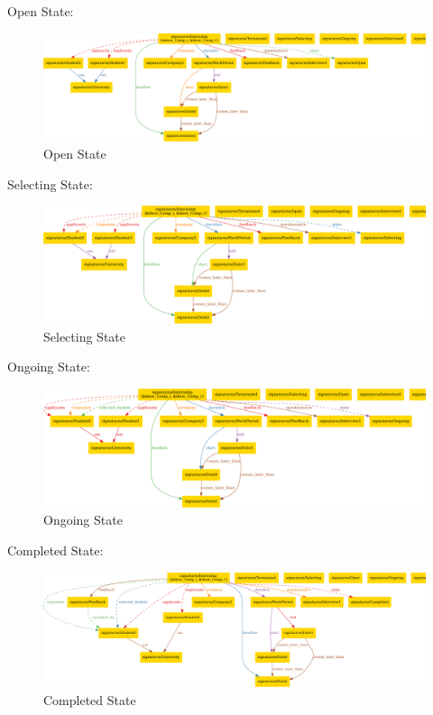 \par Open State:
\begin{figure}[H]
    \centering
    \includegraphics[width=1\textwidth,height=0.3\textheight]{Images/Alloy_images/Alloy_1-2.pdf}
    \caption{Open State}
\end{figure}

\par Selecting State:
\begin{figure}[H]
    \centering
    \includegraphics[width=1\textwidth,height=0.3\textheight]{Images/Alloy_images/Alloy_1-3.pdf}
    \caption{Selecting State}
\end{figure}

\par Ongoing State:
\begin{figure}[H]
    \centering
    \includegraphics[width=1\textwidth,height=0.3\textheight]{Images/Alloy_images/Alloy_1-4.pdf}
    \caption{Ongoing State}
\end{figure}

\par Completed State:
\begin{figure}[H]
    \centering
    \includegraphics[width=1\textwidth,height=0.3\textheight]{Images/Alloy_images/Alloy_1-5.pdf}
    \caption{Completed State}
\end{figure}

